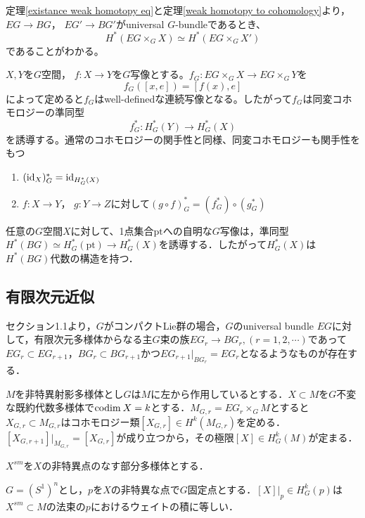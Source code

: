 定理\ref{existance weak homotopy eq}と定理\ref{weak homotopy to cohomology}より， $EG\rightarrow BG$， $EG'\rightarrow BG'$がuniversal $G$-bundleであるとき、
\[
H^*(EG\times_GX)\simeq H^*(EG\times_GX')
\]
であることがわかる。

$X, Y$を$G$空間， $f\colon X\rightarrow Y$を$G$写像とする。$f_G\colon EG\times_GX\rightarrow EG\times_GY$を
\[
f_G([x, e])=[f(x), e]
\]
によって定めると$f_G$はwell-definedな連続写像となる。したがって$f_G$は同変コホモロジーの準同型
\[
f_G^*\colon H^*_G(Y)\rightarrow H^*_G(X)
\]
を誘導する。通常のコホモロジーの関手性と同様、同変コホモロジーも関手性をもつ
\begin{prop}\:
  \begin{enumerate}
    \item $(\text{id}_{X})_G^*=\text{id}_{H^*_G(X)}$
    \item $f\colon X\rightarrow Y$， $g\colon Y\rightarrow Z$に対して$(g\circ f)_G^*=(f_G^*)\circ(g_G^*)$
  \end{enumerate}
\end{prop}

任意の$G$空間$X$に対して、1点集合$\text{pt}$への自明な$G$写像は，準同型$H^*(BG)\simeq H^*_G(\text{pt})\rightarrow H^*_G(X)$を誘導する．したがって$H^*_G(X)$は$H^*(BG)$代数の構造を持つ．



\subsection{有限次元近似}

セクション1.1より，$G$がコンパクトLie群の場合，$G$のuniversal bundle $EG$に対して，有限次元多様体からなる主$G$束の族$EG_r\rightarrow BG_r, (r=1,2,\cdots)$であって$EG_r\subset EG_{r+1}$，$BG_r\subset BG_{r+1}$かつ$EG_{r+1}|_{BG_r} = EG_r$となるようなものが存在する．


$M$を非特異射影多様体とし$G$は$M$に左から作用しているとする．$X\subset M$を$G$不変な既約代数多様体で$\text{codim}\: X =k$とする．$M_{G,r}=EG_r\times_GM$とすると$X_{G,r}\subset M_{G,r}$はコホモロジー類$[X_{G,r}]\in H^k(M_{G,r})$を定める\cite{fulton young tableaux}．$[X_{G,r+1}]|_{M_{G,r}} = [X_{G,r}]$が成り立つから，その極限$[X]\in H^k_G(M)$が定まる．

$X^{sm}$を$X$の非特異点のなす部分多様体とする．

\begin{prop}\label{restriction to fixed point}
  $G=(S^1)^n$とし，$p$を$X$の非特異な点で$G$固定点とする．$[X]|_p\in H^k_G(p)$は$X^{sm}\subset M$の法束の$p$におけるウェイトの積に等しい．
\end{prop}


